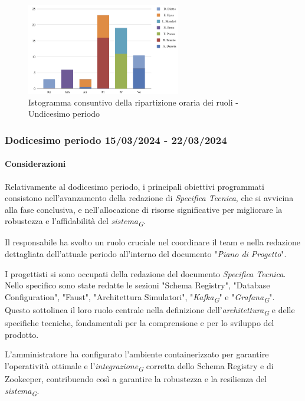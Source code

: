 \begin{figure}[H]
    \centering
    \includegraphics[width=0.6\textwidth]{../Images/graficoConsPrev11.png}
    \caption{Istogramma consuntivo della ripartizione oraria dei ruoli - Undicesimo periodo}
    \label{fig:Consuntivo_ripartizione_oraria_11}
\end{figure}


\subsubsection{Dodicesimo periodo  15/03/2024 - 22/03/2024}

\paragraph{Considerazioni}
Relativamente al dodicesimo periodo, i principali obiettivi programmati consistono nell'avanzamento della redazione di \textit{Specifica Tecnica}, che si avvicina alla fase conclusiva, e nell'allocazione di risorse significative per migliorare la robustezza e l'affidabilità del \textit{sistema}\textsubscript{\textit{G}}.

Il responsabile ha svolto un ruolo cruciale nel coordinare il team e nella redazione dettagliata dell'attuale periodo all'interno del documento "\textit{Piano di Progetto}".

I progettisti si sono occupati della redazione del documento \textit{Specifica Tecnica}. Nello specifico sono state redatte le sezioni "Schema Registry", "Database Configuration", "Faust", "Architettura Simulatori", "\textit{Kafka}\textsubscript{\textit{G}}" e "\textit{Grafana}\textsubscript{\textit{G}}". Questo sottolinea il loro ruolo centrale nella definizione dell'\textit{architettura}\textsubscript{\textit{G}} e delle specifiche tecniche, fondamentali per la comprensione e per lo sviluppo del prodotto.

L'amministratore ha configurato l'ambiente containerizzato per garantire l'operatività ottimale e l'\textit{integrazione}\textsubscript{\textit{G}} corretta dello Schema Registry e di Zookeeper, contribuendo così a garantire la robustezza e la resilienza del \textit{sistema}\textsubscript{\textit{G}}.

